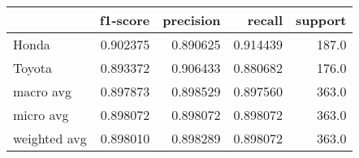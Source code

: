 \begin{tabular}{lrrrr}
\toprule
{} &  f1-score &  precision &    recall &  support \\
\midrule
Honda        &  0.902375 &   0.890625 &  0.914439 &    187.0 \\
Toyota       &  0.893372 &   0.906433 &  0.880682 &    176.0 \\
macro avg    &  0.897873 &   0.898529 &  0.897560 &    363.0 \\
micro avg    &  0.898072 &   0.898072 &  0.898072 &    363.0 \\
weighted avg &  0.898010 &   0.898289 &  0.898072 &    363.0 \\
\bottomrule
\end{tabular}
